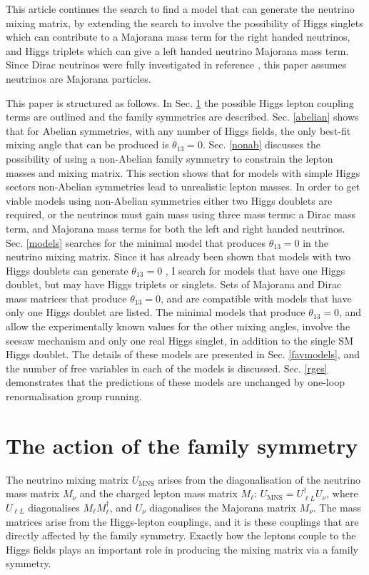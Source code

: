 \documentclass[nofootinbib,showpacs]{revtex4}
\begin{document}
This article continues the search to find a model that can generate the neutrino mixing matrix, by extending the search to involve the possibility of Higgs singlets which can contribute to a Majorana mass term for the right handed neutrinos, and Higgs triplets which can give a left handed neutrino Majorana mass term. Since Dirac neutrinos were fully investigated in reference \cite{nogo2}, this paper assumes neutrinos are Majorana particles. 

This paper is structured as follows. In Sec. \ref{secfamsym} the possible Higgs lepton coupling terms are outlined and the family symmetries are described.
Sec. \ref{abelian} shows that for Abelian symmetries, with any number of Higgs fields, the only best-fit mixing angle that can be produced is $\theta_{13}=0$. 
Sec. \ref{nonab} discusses the possibility of using a non-Abelian family symmetry to constrain the lepton masses and mixing matrix. This section shows that for models with simple Higgs sectors non-Abelian symmetries lead to unrealistic lepton masses. In order to get viable models using non-Abelian symmetries either two Higgs doublets are required, or the neutrinos must gain mass using three mass terms: a Dirac mass term, and Majorana mass terms for both the left and right handed neutrinos.
Sec. \ref{models} searches for the minimal model that produces $\theta_{13}=0$ in the neutrino mixing matrix. Since it has already been shown that models with two Higgs doublets can generate $\theta_{13}=0$ \cite{nogo2}, I search for models that have one Higgs doublet, but may have Higgs triplets or singlets. Sets of Majorana and Dirac mass matrices that produce $\theta_{13}=0$, and are compatible with models that have only one Higgs doublet are listed.
The minimal models that produce $\theta_{13}=0$, and allow the experimentally known values for the other mixing angles, involve the seesaw mechanism and only one real Higgs singlet, in addition to the single SM Higgs doublet. The details of these models are presented in Sec. \ref{favmodels}, and the number of free variables in each of the models is discussed. Sec. \ref{rges} demonstrates that the predictions of these models are unchanged by one-loop renormalisation group running.
 


\section{The action of the family symmetry}\label{secfamsym}

The neutrino mixing matrix $U_{\mathrm{MNS}}$ arises from the diagonalisation of the neutrino mass matrix $M_\nu$ and the charged lepton mass matrix $M_\ell$: $U_{\mathrm{MNS}}=U_{\ell L}^\dagger U_\nu$, where $U_{\ell L}$ diagonalises $M_\ell M_\ell^\dagger$, and $U_\nu$ diagonalises the Majorana matrix $M_\nu$. The mass matrices arise from the Higgs-lepton couplings, and it is these couplings that are directly affected by the family symmetry. Exactly how the leptons couple to the Higgs fields plays an important role in producing the mixing matrix via a family symmetry.
\end{document}
